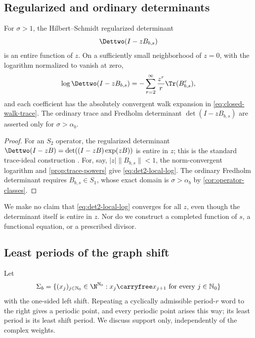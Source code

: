 \subsection{Regularized and ordinary determinants}

\begin{corollary}
\label{cor:determinant-domains}
For \(\sigma>1\), the Hilbert--Schmidt regularized determinant
\[
  \Dettwo(I-zB_{b,s})
\]
is an entire function of \(z\).  On a sufficiently small neighborhood of
\(z=0\), with the logarithm normalized to vanish at zero,
\begin{equation}
  \log\Dettwo(I-zB_{b,s})
  =
  -\sum_{r=2}^{\infty}
  \frac{z^r}{r}\Tr(B_{b,s}^r),
  \label{eq:det2-local-log}
\end{equation}
and each coefficient has the absolutely convergent walk expansion in
\cref{eq:closed-walk-trace}.  The ordinary trace and Fredholm determinant
\(\det(I-zB_{b,s})\) are asserted only for
\(\sigma>\alpha_b\).
\end{corollary}

\begin{proof}
For an \(S_2\) operator, the regularized determinant
\(\Dettwo(I-zB)=\det((I-zB)\exp(zB))\) is entire in \(z\); this is the
standard trace-ideal construction \cite{simon2005trace}.  For, say,
\(|z|\|B_{b,s}\|<1\), the norm-convergent logarithm and
\cref{prop:trace-powers} give \cref{eq:det2-local-log}.  The ordinary
Fredholm determinant requires \(B_{b,s}\in S_1\), whose exact domain is
\(\sigma>\alpha_b\) by \cref{cor:operator-classes}.
\end{proof}

We make no claim that \cref{eq:det2-local-log} converges for all \(z\), even
though the determinant itself is entire in \(z\).  Nor do we construct a
completed function of \(s\), a functional equation, or a prescribed
divisor.

\subsection{Least periods of the graph shift}

Let
\[
  \Sigma_b
  =
  \{(x_j)_{j\in\mathbb N_0}\in\N^{\mathbb N_0}:
    x_j\carryfree x_{j+1}\text{ for every }j\in\mathbb N_0\}
\]
with the one-sided left shift.  Repeating a cyclically admissible
period-\(r\) word to the right gives a periodic point, and every periodic
point arises this way; its least period is its least shift period.  We
discuss support only, independently of the complex weights.

